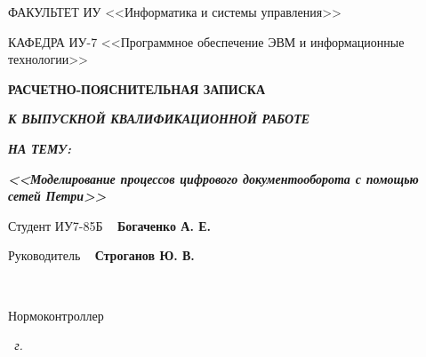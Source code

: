 \begin{titlepage}
\begin{flushleft}
		ФАКУЛЬТЕТ ИУ <<Информатика и системы управления>>

		КАФЕДРА ИУ-7 <<Программное обеспечение ЭВМ и информационные технологии>>
	\end{flushleft}

	\vfill

	\begin{center}
		\fontsize{20pt}{\baselineskip}\selectfont

		\textbf{РАСЧЕТНО-ПОЯСНИТЕЛЬНАЯ ЗАПИСКА}

		\textbf{\textit{К ВЫПУСКНОЙ КВАЛИФИКАЦИОННОЙ РАБОТЕ}}

		\textbf{\textit{НА ТЕМУ:}}
	\end{center}

	\begin{center}
		\fontsize{20pt}{0.6cm}\selectfont 
		
		\textit{\bfseries{<<Моделирование процессов цифрового документооборота с помощью сетей Петри>>}}
		
	\end{center}

	\vfill
	
	\fontsize{12pt}{0.6cm}\selectfont
	Студент \hspace{1.1cm} ИУ7-85Б \hspace{3.4cm} \uline{\mbox{\hspace*{3.5cm}}}~ \textbf{Богаченко А. Е.}
	
	\vfill
	
	Руководитель \hspace{5.2cm} \uline{\mbox{\hspace*{3.5cm}}}~ \textbf{Строганов Ю. В.}
	
	~~
	
    Нормоконтроллер \hspace{4.4cm} \uline{\mbox{\hspace*{3.5cm}}}
	
	\vfill

	\begin{center}
		\normalsize \textit{\the \year~г.}
	\end{center}
\end{titlepage}